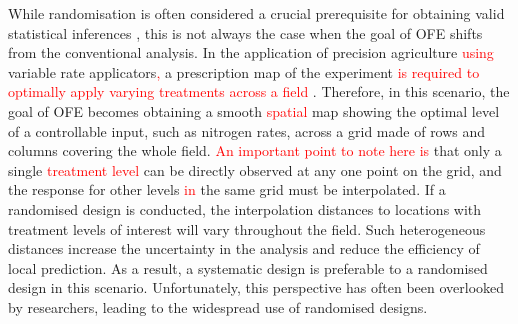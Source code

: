 \documentclass[a4paper]{article} 	%
\newcommand{\revision}[1]{\textcolor{red}{#1}}
\newcommand{\zc}[1]{\textcolor{red}{#1}}
\begin{document}
While randomisation is often considered a crucial prerequisite for obtaining valid statistical inferences \parencite{Piepho2013Why}, this is not always the case when the goal of OFE shifts from the conventional analysis. In the application of precision agriculture \revision{using} variable rate applicators\revision{,} a prescription map of the experiment \revision{is required to optimally apply varying treatments across a field} \parencite{Pringle2004FieldScale}. Therefore, in this scenario, the goal of OFE becomes obtaining a smooth \revision{spatial} map showing the optimal level of a controllable input, such as nitrogen rates, across a grid made of rows and columns covering the whole field. \revision{An important point to note here is} that only a single \revision{treatment level} can be directly observed at any one point on the grid, and the response for other levels \zc{in} the same grid must be interpolated. If a randomised design is conducted, the interpolation distances to locations with treatment levels of interest will vary throughout the field. Such heterogeneous distances increase the uncertainty in the analysis and reduce the efficiency of local prediction. As a result, a systematic design is preferable to a randomised design in this scenario. Unfortunately, this perspective has often been overlooked by researchers, leading to the widespread use of randomised designs.
\end{document}
